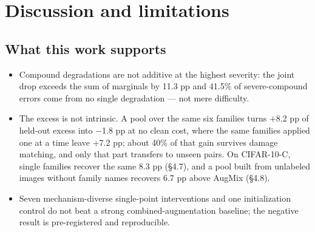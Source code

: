 \section{Discussion and limitations}
\subsection{What this work supports}
\begin{itemize}
\item Compound degradations are not additive at the highest severity: the joint drop exceeds the sum of marginals by 11.3 pp and 41.5\% of severe-compound errors come from no single degradation --- not mere difficulty.
\item The excess is not intrinsic. A pool over the same six families turns +8.2 pp of held-out excess into $-$1.8 pp at no clean cost, where the same families applied one at a time leave +7.2 pp; about 40\% of that gain survives damage matching, and only that part transfers to unseen pairs. On CIFAR-10-C, single families recover the same 8.3 pp (§4.7), and a pool built from unlabeled images without family names recovers 6.7 pp above AugMix (§4.8).
\item Seven mechanism-diverse single-point interventions and one initialization control do not beat a strong combined-augmentation baseline; the negative result is pre-registered and reproducible.
\end{itemize}

